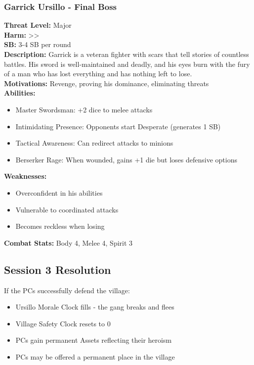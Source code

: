 \documentclass[11pt]{article}
\newenvironment{encounterbox}[1]{%
  \begin{mdframed}[backgroundcolor=encountercolor!30, linewidth=1pt, linecolor=accentcolor]%
  \subsubsection*{#1}%
}{%
  \end{mdframed}%
}
\begin{document}
\begin{encounterbox}{Garrick Ursillo - Final Boss}
\textbf{Threat Level:} Major \\
\textbf{Harm:} \textgreater\textgreater \\
\textbf{SB:} 3-4 SB per round \\
\textbf{Description:} Garrick is a veteran fighter with scars that tell stories of countless battles. His sword is well-maintained and deadly, and his eyes burn with the fury of a man who has lost everything and has nothing left to lose. \\
\textbf{Motivations:} Revenge, proving his dominance, eliminating threats \\
\textbf{Abilities:}
\begin{itemize}
    \item Master Swordsman: +2 dice to melee attacks
    \item Intimidating Presence: Opponents start Desperate (generates 1 SB)
    \item Tactical Awareness: Can redirect attacks to minions
    \item Berserker Rage: When wounded, gains +1 die but loses defensive options
\end{itemize}
\textbf{Weaknesses:}
\begin{itemize}
    \item Overconfident in his abilities
    \item Vulnerable to coordinated attacks
    \item Becomes reckless when losing
\end{itemize}
\textbf{Combat Stats:} Body 4, Melee 4, Spirit 3
\end{encounterbox}

\subsection{Session 3 Resolution}

If the PCs successfully defend the village:
\begin{itemize}
\item Ursillo Morale Clock fills - the gang breaks and flees
\item Village Safety Clock resets to 0
\item PCs gain permanent Assets reflecting their heroism
\item PCs may be offered a permanent place in the village
\end{itemize}
\end{document}
